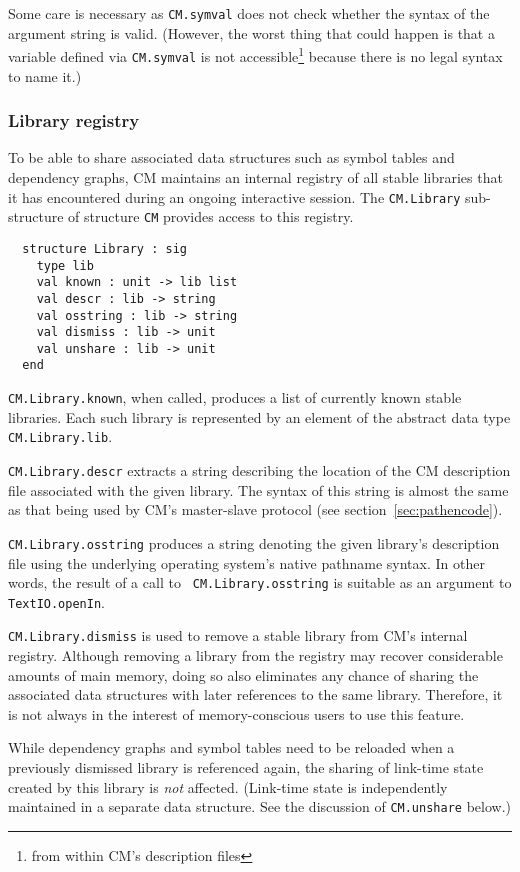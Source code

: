 \documentclass[titlepage,letterpaper]{article}
\begin{document}
Some care is necessary as {\tt CM.symval} does not check whether the
syntax of the argument string is valid.  (However, the worst thing
that could happen is that a variable defined via {\tt CM.symval} is
not accessible\footnote{from within CM's description files} because
there is no legal syntax to name it.)

\subsubsection{Library registry}
\label{sec:libreg}

To be able to share associated data structures such as symbol tables
and dependency graphs, CM maintains an internal registry of all stable
libraries that it has encountered during an ongoing interactive
session.  The {\tt CM.Library} sub-structure of structure {\tt CM}
provides access to this registry.

\begin{verbatim}
  structure Library : sig
    type lib
    val known : unit -> lib list
    val descr : lib -> string
    val osstring : lib -> string
    val dismiss : lib -> unit
    val unshare : lib -> unit
  end
\end{verbatim}

{\tt CM.Library.known}, when called, produces a list of currently
known stable libraries.  Each such library is represented by an
element of the abstract data type {\tt CM.Library.lib}.

{\tt CM.Library.descr} extracts a string describing the location of
the CM description file associated with the given library.  The syntax
of this string is almost the same as that being used by CM's
master-slave protocol (see section~\ref{sec:pathencode}).

{\tt CM.Library.osstring} produces a string denoting the given
library's description file using the underlying operating system's
native pathname syntax.  In other words, the result of a call to {\tt
CM.Library.osstring} is suitable as an argument to {\tt
TextIO.openIn}.

{\tt CM.Library.dismiss} is used to remove a stable library from CM's
internal registry.  Although removing a library from the registry may
recover considerable amounts of main memory, doing so also eliminates
any chance of sharing the associated data structures with later
references to the same library.  Therefore, it is not always in the
interest of memory-conscious users to use this feature.

While dependency graphs and symbol tables need to be reloaded when a
previously dismissed library is referenced again, the sharing of
link-time state created by this library is {\em not} affected.
(Link-time state is independently maintained in a separate data
structure.  See the discussion of {\tt CM.unshare} below.)
\end{document}
